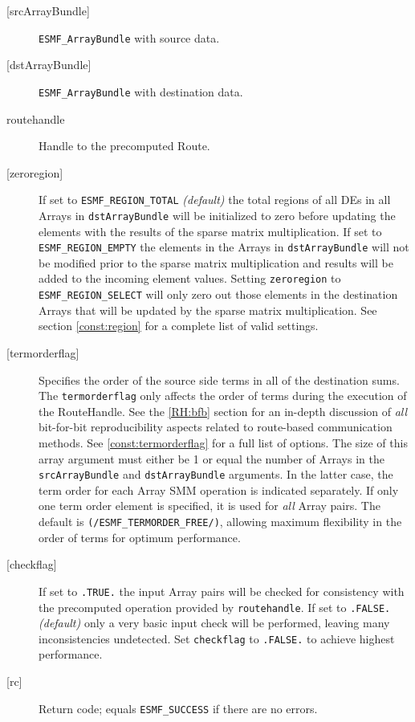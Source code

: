      \begin{description}
     \item [{[srcArrayBundle]}]
       {\tt ESMF\_ArrayBundle} with source data.
     \item [{[dstArrayBundle]}]
       {\tt ESMF\_ArrayBundle} with destination data.
     \item [routehandle]
       Handle to the precomputed Route.
     \item [{[zeroregion]}]
       If set to {\tt ESMF\_REGION\_TOTAL} {\em (default)} the total regions of 
       all DEs in all Arrays in {\tt dstArrayBundle} will be initialized to zero 
       before updating the elements with the results of the sparse matrix 
       multiplication. If set to {\tt ESMF\_REGION\_EMPTY} the elements in the
       Arrays in {\tt dstArrayBundle} will not be modified prior to the sparse
       matrix multiplication and results will be added to the incoming element
       values. Setting {\tt zeroregion} to {\tt ESMF\_REGION\_SELECT} will only
       zero out those elements in the destination Arrays that will be updated
       by the sparse matrix multiplication. See section \ref{const:region}
       for a complete list of valid settings.
     \item [{[termorderflag]}]
       Specifies the order of the source side terms in all of the destination
       sums. The {\tt termorderflag} only affects the order of terms during 
       the execution of the RouteHandle. See the \ref{RH:bfb} section for an
       in-depth discussion of {\em all} bit-for-bit reproducibility
       aspects related to route-based communication methods.
       See \ref{const:termorderflag} for a full list of options.
       The size of this array argument must either be 1 or equal the number of
       Arrays in the {\tt srcArrayBundle} and {\tt dstArrayBundle} arguments. In
       the latter case, the term order for each Array SMM operation is
       indicated separately. If only one term order element is specified, it is
       used for {\em all} Array pairs.
       The default is {\tt (/ESMF\_TERMORDER\_FREE/)}, allowing maximum 
       flexibility in the order of terms for optimum performance.
     \item [{[checkflag]}]
       If set to {\tt .TRUE.} the input Array pairs will be checked for
       consistency with the precomputed operation provided by {\tt routehandle}.
       If set to {\tt .FALSE.} {\em (default)} only a very basic input check
       will be performed, leaving many inconsistencies undetected. Set
       {\tt checkflag} to {\tt .FALSE.} to achieve highest performance.
     \item [{[rc]}]
       Return code; equals {\tt ESMF\_SUCCESS} if there are no errors.
     \end{description}
   

